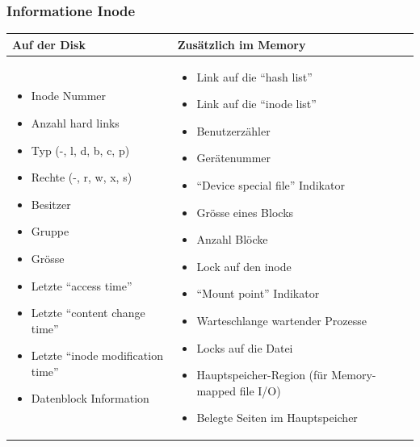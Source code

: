 \documentclass[a4paper, 10pt]{article}
\begin{document}
\subsubsection{Informatione Inode}
\begin{tabular}{p{7cm}|p{7cm}}
\textbf{Auf der Disk} & \textbf{Zus\"atzlich im Memory} \\ \hline
\begin{itemize}
\item Inode Nummer
\item Anzahl hard links
\item Typ (-, l, d, b, c, p)
\item Rechte (-, r, w, x, s)
\item Besitzer
\item Gruppe
\item Gr\"osse
\item Letzte “access time”
\item Letzte “content change time”
\item Letzte “inode modification time”
\item Datenblock Information
\end{itemize}
&
\begin{itemize}
\item Link auf die “hash list”
\item Link auf die “inode list”
\item Benutzerz\"ahler
\item Ger\"atenummer
\item “Device special file” Indikator
\item Gr\"osse eines Blocks
\item Anzahl Bl\"ocke
\item Lock auf den inode
\item “Mount point” Indikator
\item Warteschlange wartender Prozesse
\item Locks auf die Datei
\item Hauptspeicher-Region (f\"ur Memory-mapped file I/O)
\item Belegte Seiten im Hauptspeicher
\end{itemize}
\end{tabular}
\end{document}
